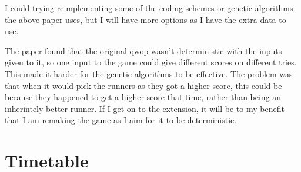 \documentclass[12pt,a4paper,twoside]{article}
\begin{document}
I could trying reimplementing some of the coding schemes or genetic algorithms the above paper uses, but I will have more options as I have the extra data to use.

The paper found that the original qwop wasn't deterministic with the inputs given to it, so one input to the game could give different scores on different tries. This made it harder for the genetic algorithms to be effective. 
The problem was that when it would pick the runners as they got a higher score, this could be because they happened to get a higher score that time, rather than being an inherintely better runner.
If I get on to the extension, it will be to my benefit that I am remaking the game as I aim for it to be deterministic.



\section*{Timetable}


\end{document}
